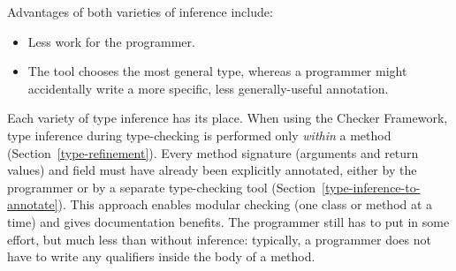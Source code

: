 Advantages of both varieties of inference include:
\begin{itemize}
\item
  Less work for the programmer.
\item
  The tool chooses the most general type, whereas a programmer might
  accidentally write a more specific, less generally-useful annotation.
\end{itemize}


Each variety of type inference has its place.  When using the Checker
Framework, type inference during type-checking is performed only
\emph{within} a method (Section~\ref{type-refinement}).  Every method
signature (arguments and return values) and field must have already been explicitly annotated,
either by the programmer or by a separate type-checking tool
(Section~\ref{type-inference-to-annotate}).
This approach enables modular checking (one class or method at a time) and
gives documentation benefits.
The programmer still has to
put in some effort, but much less than without inference:  typically, a
programmer does not have to write any qualifiers
inside the body of a method.



